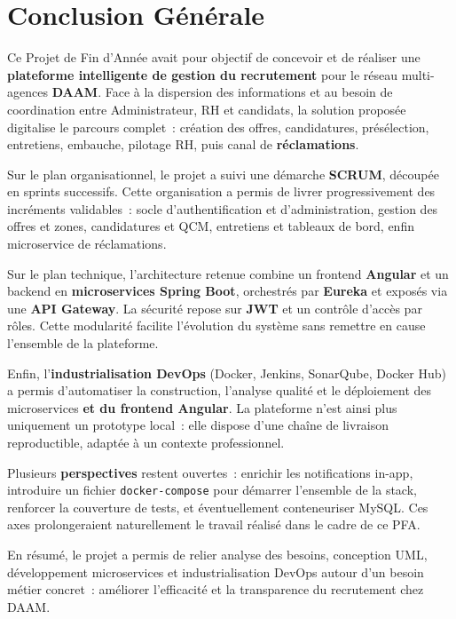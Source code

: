 \chapter*{Conclusion Générale}
\thispagestyle{plain}

\begingroup
{}
\setlength{\parskip}{0.55em}

Ce Projet de Fin d'Année avait pour objectif de concevoir et de réaliser
une \textbf{plateforme intelligente de gestion du recrutement} pour le
réseau multi-agences \textbf{DAAM}. Face à la dispersion des informations
et au besoin de coordination entre Administrateur, RH et candidats, la
solution proposée digitalise le parcours complet~: création des offres,
candidatures, présélection, entretiens, embauche, pilotage RH, puis
canal de \textbf{réclamations}.

Sur le plan organisationnel, le projet a suivi une démarche
\textbf{SCRUM}, découpée en sprints successifs. Cette organisation a
permis de livrer progressivement des incréments validables~: socle
d'authentification et d'administration, gestion des offres et zones,
candidatures et QCM, entretiens et tableaux de bord, enfin microservice
de réclamations.

Sur le plan technique, l'architecture retenue combine un frontend
\textbf{Angular} et un backend en \textbf{microservices Spring Boot},
orchestrés par \textbf{Eureka} et exposés via une \textbf{API Gateway}.
La sécurité repose sur \textbf{JWT} et un contrôle d'accès par rôles.
Cette modularité facilite l'évolution du système sans remettre en cause
l'ensemble de la plateforme.

Enfin, l'\textbf{industrialisation DevOps} (Docker, Jenkins, SonarQube,
Docker Hub) a permis d'automatiser la construction, l'analyse qualité et
le déploiement des microservices \textbf{et du frontend Angular}. La
plateforme n'est ainsi plus uniquement un prototype local~: elle dispose
d'une chaîne de livraison reproductible, adaptée à un contexte
professionnel.

Plusieurs \textbf{perspectives} restent ouvertes~: enrichir les
notifications in-app, introduire un fichier \texttt{docker-compose} pour
démarrer l'ensemble de la stack, renforcer la couverture de tests, et
éventuellement conteneuriser MySQL. Ces axes prolongeraient naturellement
le travail réalisé dans le cadre de ce PFA.

En résumé, le projet a permis de relier analyse des besoins, conception
UML, développement microservices et industrialisation DevOps autour d'un
besoin métier concret~: améliorer l'efficacité et la transparence du
recrutement chez DAAM.

\endgroup
\clearpage
